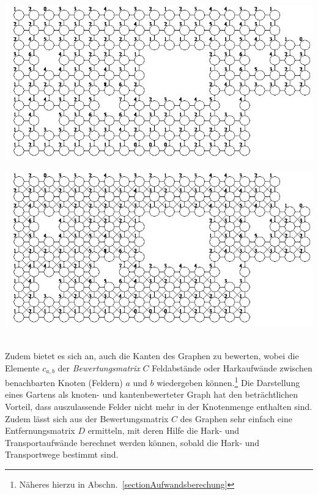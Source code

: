 \documentclass[fontsize=12pt,doubleside,openany,listof=totoc,listof=flat,listof=nochaptergap,numbers=noenddot]{scrbook}
\theoremstyle{style}
\begin{document}
\begin{center}
\begin{minipage}{\textwidth}
\centerline{\includegraphics[angle=0,scale=0.64]{Figures/Laub/Nachbarschaftsvariante_a.jpg}}
\label{HJKmlp_image_Nachbarschaft_a}
\end{minipage}
\end{center}

\begin{center}
\begin{minipage}{\textwidth}
\centerline{\includegraphics[angle=0,scale=0.64]{Figures/Laub/Nachbarschaftsvariante_b.jpg}}
\label{HJKmlp_image_Nachbarschaft_b}
\end{minipage}
\end{center}
	 
\phantom \\
\noindent Zudem bietet es sich an, auch die Kanten des Graphen zu bewerten, wobei die Elemente $c_{a,b}$ der \textit{Bewertungsmatrix} $C$\label{Bewertungsmatrix} Feldabstände oder Harkaufwände zwischen benachbarten Knoten (Feldern) $a$ und $b$ wiedergeben können.\footnote{Näheres hierzu in Abschn.~\ref{sectionAufwandsberechung}} 
Die Darstellung eines Gartens als knoten- und kantenbewerteter Graph hat den beträchtlichen Vorteil, dass auszulassende Felder nicht mehr in der Knotenmenge enthalten sind. 
Zudem lässt sich aus der Bewertungsmatrix $C$ des Graphen sehr einfach eine Entfernungsmatrix\label{Entfernungsmatrix} $D$ ermitteln, mit deren Hilfe die Hark- und Transportaufwände berechnet werden können, sobald die Hark- und Transportwege bestimmt sind. 
\end{document}
